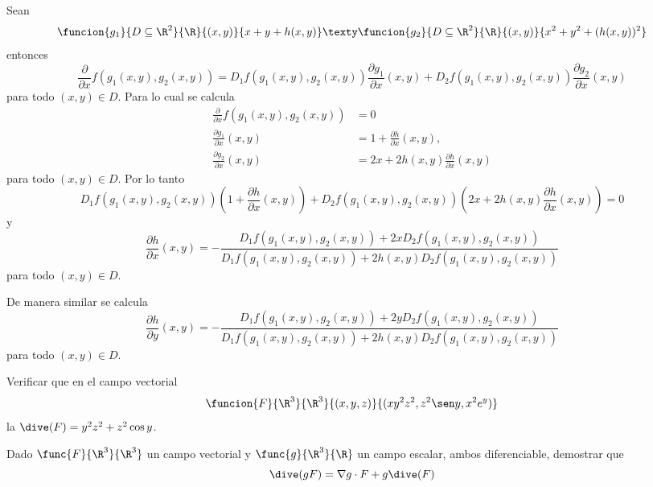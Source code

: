 \documentclass[a4,11pt]{aleph-examen}
\begin{document}
\begin{preguntas}
\begin{respuesta}
\begin{respuesta}
\begin{respuesta}
    Sean
    \[
    \funcion{g_1}{D \subseteq \R^2}{\R}{(x,y)}{x+y+h(x,y)}  \texty  \funcion{g_2}{D \subseteq \R^2}{\R}{(x,y)}{x^2+y^2+(h(x,y))^2}
    \]
    entonces
    \[
    \frac{\partial}{\partial x}f(g_1(x,y),g_2(x,y))=D_1f(g_1(x,y),g_2(x,y))\frac{\partial g_1}{\partial x}(x,y)+D_2f(g_1(x,y),g_2(x,y))\frac{\partial g_2}{\partial x}(x,y)
    \]
    para todo $(x,y) \in D$. Para lo cual se calcula  
    \begin{align*}
    \frac{\partial}{\partial x}f(g_1(x,y),g_2(x,y))&=0\\
    \frac{\partial g_1}{\partial x}(x,y)&=1+\frac{\partial h}{\partial x}(x,y),\\
    \frac{\partial g_2}{\partial x}(x,y)&=2x+2h(x,y) \frac{\partial h}{\partial x}(x,y)
    \end{align*}
    para todo $(x,y) \in D$. Por lo tanto
    \[
    D_1f(g_1(x,y),g_2(x,y))\left(1+\frac{\partial h}{\partial x}(x,y)\right)+D_2f(g_1(x,y),g_2(x,y))\left(2x+2h(x,y) \frac{\partial h}{\partial x}(x,y)\right)=0
    \]
    y
    \[
    \frac{\partial h}{\partial x}(x,y)=-\frac{D_1f(g_1(x,y),g_2(x,y))+2xD_2f(g_1(x,y),g_2(x,y))}{D_1f(g_1(x,y),g_2(x,y))+2h(x,y)D_2f(g_1(x,y),g_2(x,y))}
    \]
    para todo $(x,y) \in D$. 
    
    De manera similar se calcula
    \[
    \frac{\partial h}{\partial y}(x,y)=-\frac{D_1f(g_1(x,y),g_2(x,y))+2yD_2f(g_1(x,y),g_2(x,y))}{D_1f(g_1(x,y),g_2(x,y))+2h(x,y)D_2f(g_1(x,y),g_2(x,y))}
    \]
    para todo $(x,y) \in D$.
\end{respuesta} 

\item
    Verificar que en el campo vectorial
    \[
    \funcion{F}{\R^3}{\R^3}{(x,y,z)}{(xy^2z^2,z^2\sen y,x^2e^y)}
    \]
    la $\dive(F)=y^2z^2+z^2 \cos y$.
    

\item 
    Dado $\func{F}{\R^3}{\R^3}$ un campo vectorial y $\func{g}{\R^3}{\R}$ un campo escalar, ambos diferenciable, demostrar que
    \[
        \dive(gF) = \nabla g\cdot F + g\dive(F) 
    \]


\end{respuesta}
\end{respuesta}
\end{preguntas}
\end{document}
